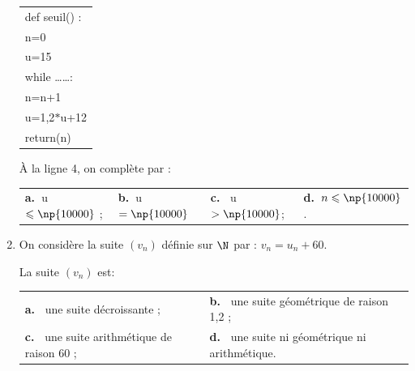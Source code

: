\begin{enumerate}
\begin{center}
\begin{tabular}{|>{\ttfamily}l|}\hline
def seuil() :\\
\qquad n=0\\
\qquad u=15\\
\qquad while \ldots \ldots:\\
\qquad \quad n=n+1\\
\qquad \quad u=1,2$*$u+12\\
\qquad return(n)\\ \hline
\end{tabular}
\end{center}

À la ligne 4, on complète par :

\begin{center}
\begin{tabularx}{\linewidth}{*{4}{X}}
\textbf{a.~}u$\leqslant \np{10000}$ ; &\textbf{b.~}u $=\np{10000}$ &\textbf{c.~} u$> \np{10000}$;&\textbf{d.~}$n\leqslant \np{10000}$.\\
\end{tabularx}
\end{center}

\item On considère la suite $\left(v_n\right)$ définie sur $\N$ par : $v_n = u_n + 60$. 

La suite $\left(v_n\right)$ est:

\begin{center}
\begin{tabularx}{\linewidth}{*{2}{X}}
\textbf{a.~} une suite décroissante ; &\textbf{b.~} une suite géométrique de raison 1,2 ;\\
\textbf{c.~} une suite arithmétique de raison $60$ ;&\textbf{d.~} une suite ni géométrique ni arithmétique.
\end{tabularx}
\end{center}
\end{enumerate}

\bigskip
